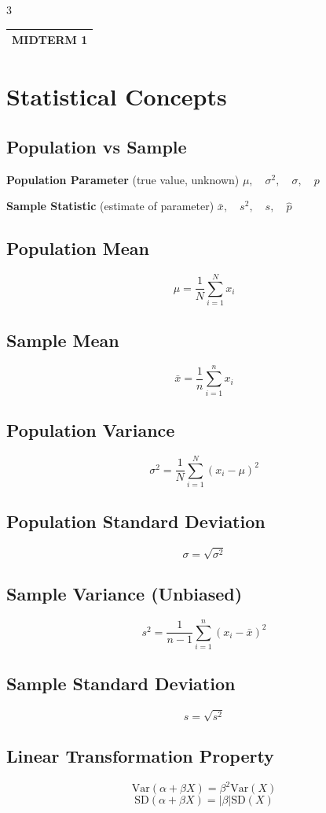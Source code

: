 \documentclass[10pt]{article}
\makeatletter
\newcommand{\termheader}[1]{%
  \par\noindent
  \begin{tabular}{@{}p{\linewidth}@{}}
    \small\bfseries\uppercase{#1} \\ \hline
  \end{tabular}
  \par\vspace{0pt}
}
\makeatother
\begin{document}
\begin{multicols}{3}
\termheader{Midterm 1}
\section*{Statistical Concepts}

\subsection*{Population vs Sample}

\textbf{Population Parameter} (true value, unknown)  $\mu, \quad \sigma^2, \quad \sigma, \quad p$


\textbf{Sample Statistic} (estimate of parameter) $\bar{x}, \quad s^2, \quad s, \quad \hat{p}$

\subsection*{Population Mean}
\[
\mu = \frac{1}{N} \sum_{i=1}^{N} x_i
\]

\subsection*{Sample Mean}
\[
\bar{x} = \frac{1}{n} \sum_{i=1}^{n} x_i
\]

\subsection*{Population Variance}
\[
\sigma^2 = \frac{1}{N} \sum_{i=1}^{N} (x_i - \mu)^2
\]

\subsection*{Population Standard Deviation}
\[
\sigma = \sqrt{\sigma^2}
\]

\subsection*{Sample Variance (Unbiased)}
\[
s^2 = \frac{1}{n-1} \sum_{i=1}^{n} (x_i - \bar{x})^2
\]

\subsection*{Sample Standard Deviation}
\[
s = \sqrt{s^2}
\]

\subsection*{Linear Transformation Property}
\[
\text{Var}(\alpha + \beta X) = \beta^2 \text{Var}(X)
\]
\[
\text{SD}(\alpha + \beta X) = |\beta| \text{SD}(X)
\]


\end{multicols}
\end{document}
